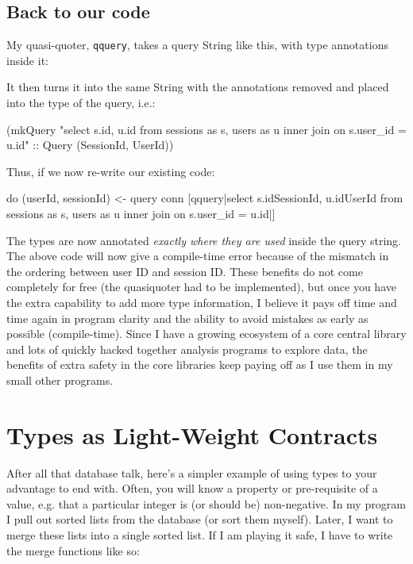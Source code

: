 \documentclass{tmr}
\begin{document}
\subsection{Back to our code}

My quasi-quoter, \lstinline|qquery|, takes a query String like this, with type annotations inside it:

\begin{code}
[qquery|select s.id{SessionId}, u.id{UserId} from sessions as s, users as u
   inner join on s.user_id = u.id|]
\end{code}

It then turns it into the same String with the annotations removed and placed into the type of the query, i.e.:

\begin{code}
(mkQuery "select s.id, u.id from sessions as s, users as u inner join
  on s.user_id = u.id" :: Query (SessionId, UserId))
\end{code}

Thus, if we now re-write our existing code:

\begin{code}
do (userId, sessionId) <- query conn [qquery|select s.id{SessionId},
     u.id{UserId} from sessions as s, users as u
     inner join on s.user_id = u.id|]
\end{code}

The types are now annotated \textit{exactly where they are used} inside the query string.  The above code will now give a compile-time error because of the mismatch in the ordering between user ID and session ID\@.  These benefits do not come completely for free (the quasiquoter had to be implemented), but once you have the extra capability to add more type information, I believe it pays off time and time again in program clarity and the ability to avoid mistakes as early as possible (compile-time).  Since I have a growing ecosystem of a core central library and lots of quickly hacked together analysis programs to explore data, the benefits of extra safety in the core libraries keep paying off as I use them in my small other programs.

\section{Types as Light-Weight Contracts}

After all that database talk, here's a simpler example of using types to your advantage to end with.   Often, you will know a property or pre-requisite of a value, e.g. that a particular integer is (or should be) non-negative.  In my program I pull out sorted lists from the database (or sort them myself).  Later, I want to merge these lists into a single sorted list.  If I am playing it safe, I have to write the merge functions like so:
\end{document}
